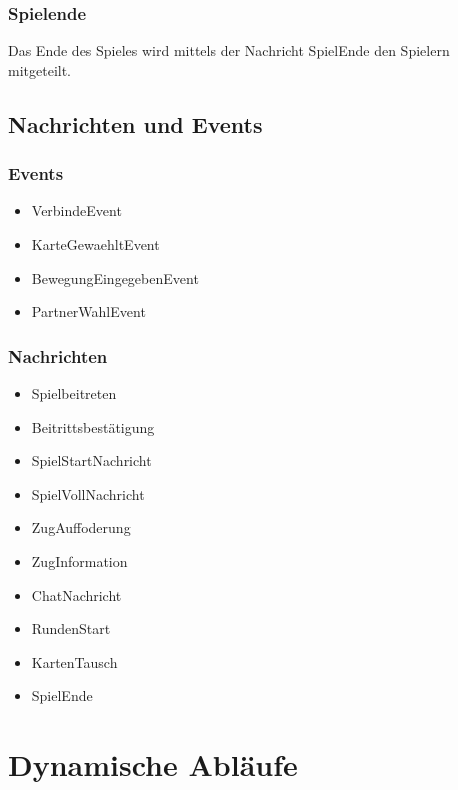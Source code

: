 \documentclass[12pt,halfparskip]{scrartcl}
\begin{document}
\subsubsection{Spielende} %
\label{ssub:spielende}

Das Ende des Spieles wird mittels der Nachricht SpielEnde den Spielern mitgeteilt. 

\clearpage
\subsection{Nachrichten und Events} %
\label{sub:nachrichten_und_events}


\subsubsection{Events} %
\label{ssub:events}

\begin{itemize}
	\item VerbindeEvent
	\item KarteGewaehltEvent
	\item BewegungEingegebenEvent
	\item PartnerWahlEvent
\end{itemize}


\subsubsection{Nachrichten} %
\label{ssub:nachrichten}

\begin{itemize}
	\item Spielbeitreten
	\item Beitrittsbestätigung
	\item SpielStartNachricht
	\item SpielVollNachricht
	\item ZugAuffoderung
	\item ZugInformation
	\item ChatNachricht
	\item RundenStart
	\item KartenTausch
	\item SpielEnde
\end{itemize}

\clearpage
\section{Dynamische Abläufe} %
\label{dynamische_ablauefe}
\end{document}
